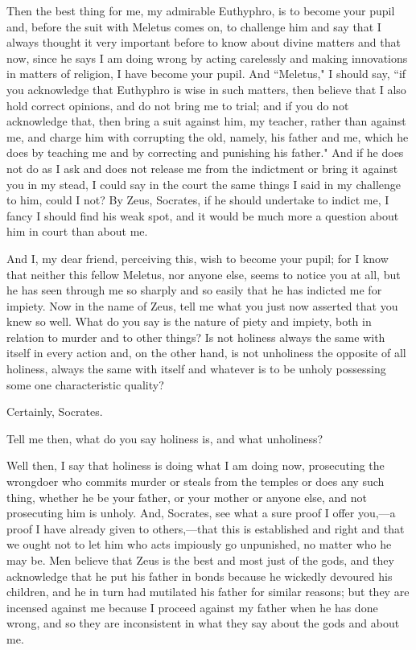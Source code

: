 \documentclass[letterpaper,12pt]{article}
\newcommand{\stephpag}[1]{\marginnote{\small\itshape\fontfamily{ppl}\selectfont #1}}
\begin{document}
\begin{drama}
\socratesspeaks
Then the best thing for me, my admirable Euthyphro, is to become your pupil and, before the suit with Meletus comes on, to challenge him and say that I always thought it very important before to know about divine matters and that now, since he says I am doing wrong by acting carelessly and making innovations in matters of religion, I have become your pupil. And ``Meletus," I should say, \stephpag{b} ``if you acknowledge that Euthyphro is wise in such matters, then believe that I also hold correct opinions, and do not bring me to trial; and if you do not acknowledge that, then bring a suit against him, my teacher, rather than against me, and charge him with corrupting the old, namely, his father and me, which he does by teaching me and by correcting and punishing his father." And if he does not do as I ask and does not release me from the indictment or bring it against you in my stead, I could say in the court the same things I said in my challenge to him, could I not?
\clearpage
\euthyphrospeaks
By Zeus, Socrates, if he should undertake to indict me, \stephpag{c} I fancy I should find his weak spot, and it would be much more a question about him in court than about me.

\socratesspeaks
And I, my dear friend, perceiving this, wish to become your pupil; for I know that neither this fellow Meletus, nor anyone else, seems to notice you at all, but he has seen through me so sharply and so easily that he has indicted me for impiety. Now in the name of Zeus, tell me what you just now asserted that you knew so well. What do you say is the nature of piety and impiety, both \stephpag{d} in relation to murder and to other things? Is not holiness always the same with itself in every action and, on the other hand, is not unholiness the opposite of all holiness, always the same with itself and whatever is to be unholy possessing some one characteristic quality?

\euthyphrospeaks
Certainly, Socrates.

\socratesspeaks
Tell me then, what do you say holiness is, and what unholiness?

\euthyphrospeaks
Well then, I say that holiness is doing what I am doing now, prosecuting the wrongdoer who commits murder or steals from the temples or does any such thing, whether he be your father, \stephpag{e} or your mother or anyone else, and not prosecuting him is unholy. And, Socrates, see what a sure proof I offer you,—a proof I have already given to others,—that this is established and right and that we ought not to let him who acts impiously go unpunished, no matter who he may be. Men believe \stephpag{6 a} that Zeus is the best and most just of the gods, and they acknowledge that he put his father in bonds because he wickedly devoured his children, and he in turn had mutilated his father for similar reasons; but they are incensed against me because I proceed against my father when he has done wrong, and so they are inconsistent in what they say about the gods and about me.


\end{drama}
\end{document}
